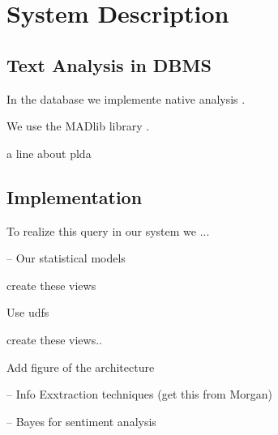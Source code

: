 
\section{System Description}

\subsection{Text Analysis in DBMS}

In the database we implemente native analysis .

We use the MADlib library \cite{Cohen:2009:MSN:1687553.1687576}.

a line about plda 

\subsection{{\system} Implementation}
To realize this query in our system we ...

-- Our statistical models

create these views

Use udfs

create these views..

Add figure of the architecture

-- Info Exxtraction techniques (get this from Morgan)

-- Bayes  for sentiment analysis



